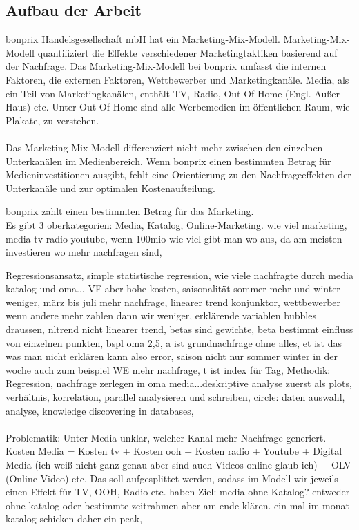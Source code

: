 \subsection{Aufbau der Arbeit}

\iffalse
bonprix Handelsgesellschaft mbH hat ein Marketing-Mix-Modell. Marketing-Mix-Modell quantifiziert die Effekte verschiedener Marketingtaktiken basierend auf der Nachfrage\cite{MMMdef}. Das Marketing-Mix-Modell bei bonprix umfasst die internen Faktoren, die externen Faktoren, Wettbewerber und Marketingkanäle. Media, als ein Teil von Marketingkanälen, enthält TV, Radio, Out Of Home (Engl. Außer Haus) etc. Unter Out Of Home sind alle Werbemedien im öffentlichen Raum, wie Plakate, zu verstehen. \\\\
Das Marketing-Mix-Modell differenziert nicht mehr zwischen den einzelnen Unterkanälen im Medienbereich. Wenn bonprix einen bestimmten Betrag für Medieninvestitionen ausgibt, fehlt eine Orientierung zu den Nachfrageeffekten der Unterkanäle und zur optimalen Kostenaufteilung.

bonprix zahlt einen bestimmten Betrag für das Marketing. \\ 
Es gibt 3 oberkategorien: Media, Katalog, Online-Marketing. wie viel marketing, media tv radio youtube, wenn 100mio wie viel gibt man wo aus, da am meisten investieren wo mehr nachfragen sind, 

Regressionsansatz, simple statistische regression, wie viele nachfragte durch media katalog und oma... VF aber hohe kosten, saisonalität sommer mehr und winter weniger, märz bis juli mehr nachfrage, linearer trend konjunktor, wettbewerber wenn andere mehr zahlen dann wir weniger, erklärende variablen bubbles draussen, nltrend nicht linearer trend, betas sind gewichte, beta bestimmt einfluss von einzelnen punkten, bspl oma 2,5, a ist grundnachfrage ohne alles, et ist das was man nicht erklären kann also error, saison nicht nur sommer winter in der woche auch zum beispiel WE mehr nachfrage, t ist index für Tag,
Methodik: Regression, nachfrage zerlegen in oma media...deskriptive analyse zuerst als plots, verhältnis, korrelation, parallel analysieren und schreiben, circle: daten auswahl, analyse, knowledge discovering in databases, \\ \\
Problematik: Unter Media unklar, welcher Kanal mehr Nachfrage generiert. Kosten Media = Kosten tv + Kosten ooh + Kosten radio + Youtube + Digital Media (ich weiß nicht ganz genau aber sind auch Videos online glaub ich) + OLV (Online Video) etc.
Das soll aufgesplittet werden, sodass im Modell wir jeweils einen Effekt für TV, OOH, Radio etc. haben
Ziel: media ohne Katalog? entweder ohne katalog oder bestimmte zeitrahmen aber am ende klären.  
ein mal im monat katalog schicken daher ein peak,

